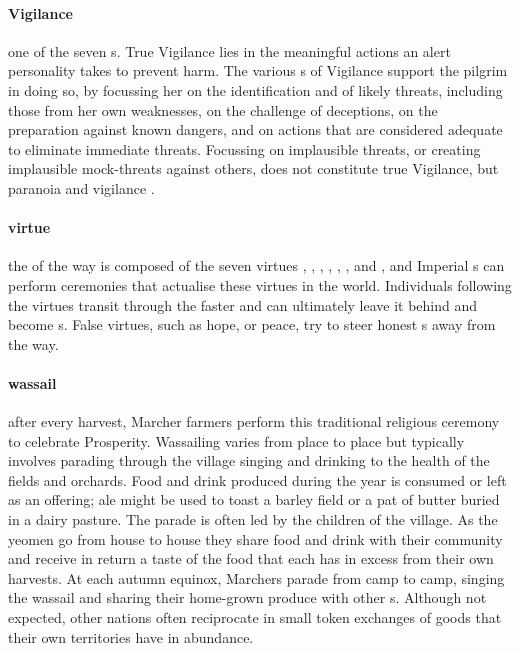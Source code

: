 \paragraph{Vigilance} one of the seven s. True Vigilance lies in the meaningful actions an alert personality takes to prevent harm. The various s of Vigilance support the pilgrim in doing so, by focussing her on the identification and of likely threats, including those from her own weaknesses, on the challenge of deceptions, on the preparation against known dangers, and on actions that are considered adequate to eliminate immediate threats. Focussing on implausible threats, or creating implausible mock-threats against others, does not constitute true Vigilance, but paranoia and vigilance .
\paragraph{virtue} the  of the way is composed of the seven virtues , , , , , , and , and Imperial s can perform ceremonies that actualise these virtues in the world. Individuals following the virtues transit through the  faster and can ultimately leave it behind and become s. False virtues, such as hope,  or peace, try to steer honest s away from the way. 
\paragraph{wassail} after every harvest, Marcher farmers perform this traditional religious ceremony to celebrate Prosperity. Wassailing varies from place to place but typically involves parading through the village singing and drinking to the health of the fields and orchards. Food and drink produced during the year is consumed or left as an offering; ale might be used to toast a barley field or a pat of butter buried in a dairy pasture. The parade is often led by the children of the village. As the yeomen go from house to house they share food and drink with their community and receive in return a taste of the food that each  has in excess from their own harvests. At each autumn equinox, Marchers parade from camp to camp, singing the wassail and sharing their home-grown produce with other s. Although not expected, other nations often reciprocate in small token exchanges of goods that their own territories have in abundance.
